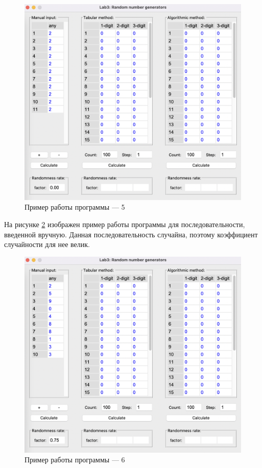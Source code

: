 \documentclass[12pt]{report}
\begin{document}
\begin{figure}[h!btp]
	\centering
	\includegraphics[width=1\textwidth]{inc/pic5.png}
	\caption{Пример работы программы --- 5}
	\label{fig:pic5}	
\end{figure}

\clearpage
На рисунке \ref{fig:pic6} изображен пример работы программы для последовательности, введенной вручную. Данная последовательность случайна, поэтому коэффициент случайности для нее велик.

\begin{figure}[h!btp]
	\centering
	\includegraphics[width=1\textwidth]{inc/pic6.png}
	\caption{Пример работы программы --- 6}
	\label{fig:pic6}	
\end{figure}

	
\end{document}
